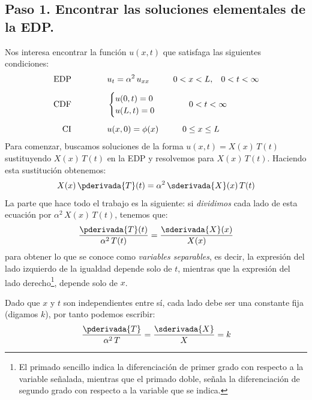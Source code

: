 \subsection{Paso 1. Encontrar las soluciones elementales de la EDP.}

Nos interesa encontrar la función $u (x, t)$ que satisfaga las siguientes condiciones:
\begin{align*}
\text{EDP} \hspace{1.5cm} &u_{t} = \alpha^{2} \, u_{xx} \hspace{1cm} 0 < x < L, \hspace{0.3cm} 0 < t < \infty \\[0.5em] 
\text{CDF} \hspace{1.5cm} &\begin{cases}
u (0, t) = 0 \\
u (L, t) = 0
\end{cases}
\hspace{1cm}
0 < t < \infty \\[0.5em]
\text{CI} \hspace{1.5cm} & u (x, 0) = \phi (x) \hspace{1cm} 0 \leq x \leq L
\end{align*}
Para comenzar, buscamos soluciones de la forma $u (x, t) = X (x) \, T (t)$ sustituyendo $X (x) \, T (t)$ en la EDP y resolvemos para  $X (x) \, T (t)$. Haciendo esta sustitución obtenemos:
\begin{align*}
X (x) \, \pderivada{T} (t) = \alpha^{2} \, \sderivada{X} (x) \, T (t)
\end{align*}
La parte que hace todo el trabajo es la siguiente: si \emph{dividimos} cada lado de esta ecuación por $\alpha^{2} \, X (x) \, T (t)$, tenemos que:
\begin{align*}
\dfrac{\pderivada{T} (t)}{\alpha^{2} \, T (t)} = \dfrac{\sderivada{X} (x)}{X (x)}
\end{align*}
para obtener lo que se conoce como \emph{variables separables}, es decir, la expresión del lado izquierdo de la igualdad depende solo de $t$, mientras que la expresión del lado derecho\footnote{El primado sencillo indica la diferenciación de primer grado con respecto a la variable señalada, mientras que el primado doble, señala la diferenciación de segundo grado con respecto a la variable que se indica.}, depende solo de $x$.
\par
Dado que $x$ y $t$ son independientes entre sí, cada lado debe ser una constante fija (digamos $k$),  por tanto podemos escribir:
\begin{align*}
\dfrac{\pderivada{T}}{\alpha^{2} \, T} = \dfrac{\sderivada{X}}{X} = k
\end{align*}
